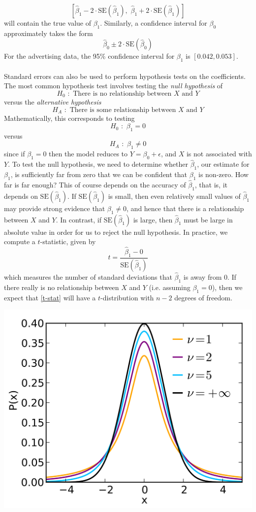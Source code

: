 \[\left[\hat{\beta}_1 - 2 \cdot \text{SE}(\hat{\beta}_1), \,\, \hat{\beta}_1 + 2 \cdot \text{SE}(\hat{\beta}_1)\right]\]
will contain the true value of $\beta_1$. Similarly, a confidence interval for $\beta_0$ approximately takes the form
\[\hat{\beta}_0 \pm 2 \cdot \text{SE}(\hat{\beta}_0)\]
For the advertising data, the 95\% confidence interval for $\beta_1$ is $[0.042, 0.053]$.\\\\
Standard errors can also be used to perform hypothesis tests on the coefficients. The most common hypothesis test involves testing the \textit{null hypothesis} of
\[H_0 \,\, :\,\, \text{There is no relationship between $X$ and $Y$}\]
versus the \textit{alternative hypothesis}
\[H_A \,\, : \,\, \text{There is some relationship between $X$ and $Y$}\]
Mathematically, this corresponds to testing
\[H_0 \,\, : \,\, \beta_1 = 0\]
versus
\[H_A \,\, : \,\, \beta_1 \neq 0\]
since if $\beta_1 = 0$ then the model reduces to $Y = \beta_0 + \epsilon$, and $X$ is
not associated with $Y$. To test the null hypothesis, we need to determine whether $\hat{\beta}_1$, our estimate for $\beta_1$, is sufficiently far from zero that we can be confident that $\beta_1$ is non-zero. How far is far enough? This of course depends on the accuracy of $\hat{\beta}_1$, that is, it depends on $\text{SE}(\hat{\beta}_1)$. If $\text{SE}(\hat{\beta}_1)$ is small, then even relatively small values of $\hat{\beta}_1$ may provide strong evidence that $\beta_1 \neq 0$, and hence that there is a relationship between $X$ and $Y$. In contrast, if $\text{SE}(\hat{\beta}_1)$ is large, then $\hat{\beta}_1$ must be large in absolute value in order for us to reject the null hypothesis. In practice, we compute a $t$-statistic, given by
\begin{equation}
    t = \frac{\hat{\beta}_1 - 0}{\text{SE}(\hat{\beta}_1)}
    \label{t-stat}
\end{equation}
which measures the number of standard deviations that $\hat{\beta}_1$ is away from 0. If there really is no relationship between $X$ and $Y$ (i.e. assuming $\beta_1 = 0$), then we expect that \ref{t-stat} will have a $t$-distribution with $n - 2$ degrees of freedom.
\begin{center}
    \includegraphics[scale=0.1]{images/t-distr.png}
\end{center}

